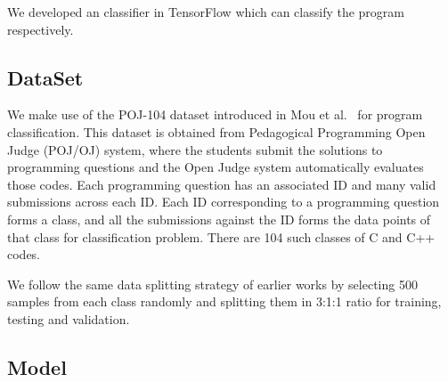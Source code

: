 
We developed an classifier in TensorFlow\cite{tensorflow_USENIX2016} which can classify the program respectively. 
\subsection{DataSet}

We make use of the POJ-104 dataset introduced in Mou et al.~\cite{tbcnn-aaai16} for program classification. This dataset is obtained from Pedagogical Programming Open Judge (POJ/OJ) system, where the students submit the solutions to programming questions and the Open Judge system automatically evaluates those codes. 
Each programming question has an associated ID and many valid submissions across each ID. 
Each ID corresponding to a programming question forms a class, and all the submissions against the ID forms the data points of that class for classification problem. There are 104 such classes of C and C++ codes.

We follow the same data splitting strategy of earlier works by selecting 500 samples from each class randomly and splitting them in 3:1:1 ratio for training, testing and validation.


\subsection{Model}


